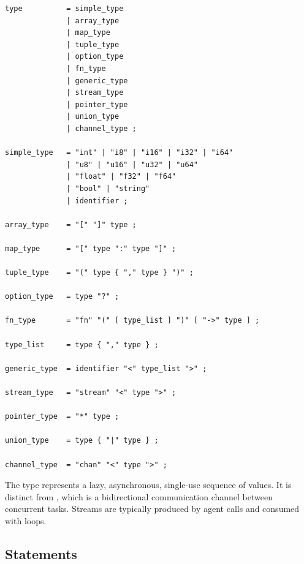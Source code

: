 \begin{lstlisting}[language=EBNF]
type          = simple_type
              | array_type
              | map_type
              | tuple_type
              | option_type
              | fn_type
              | generic_type
              | stream_type
              | pointer_type
              | union_type
              | channel_type ;

simple_type   = "int" | "i8" | "i16" | "i32" | "i64"
              | "u8" | "u16" | "u32" | "u64"
              | "float" | "f32" | "f64"
              | "bool" | "string"
              | identifier ;

array_type    = "[" "]" type ;

map_type      = "[" type ":" type "]" ;

tuple_type    = "(" type { "," type } ")" ;

option_type   = type "?" ;

fn_type       = "fn" "(" [ type_list ] ")" [ "->" type ] ;

type_list     = type { "," type } ;

generic_type  = identifier "<" type_list ">" ;

stream_type   = "stream" "<" type ">" ;

pointer_type  = "*" type ;

union_type    = type { "|" type } ;

channel_type  = "chan" "<" type ">" ;
\end{lstlisting}

\begin{note}
The  type represents a lazy, asynchronous, single-use sequence of values. It is distinct from , which is a bidirectional communication channel between concurrent tasks. Streams are typically produced by agent  calls and consumed with  loops.
\end{note}

\subsection{Statements}

